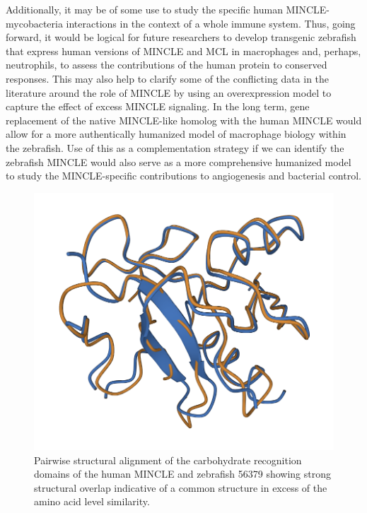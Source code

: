 Additionally, it may be of some use to study the specific human MINCLE\hyp{}mycobacteria interactions in the context of a whole immune system. Thus, going forward, it would be logical for future researchers to develop transgenic zebrafish that express human versions of MINCLE and MCL in macrophages and, perhaps, neutrophils, to assess the contributions of the human protein to conserved responses. This may also help to clarify some of the conflicting data in the literature around the role of MINCLE by using an overexpression model to capture the effect of excess MINCLE signaling. In the long term, gene replacement of the native MINCLE\hyp{}like homolog with the human MINCLE would allow for a more authentically humanized model of macrophage biology within the zebrafish. Use of this as a complementation strategy if we can identify the zebrafish MINCLE would also serve as a more comprehensive humanized model to study the MINCLE\hyp{}specific contributions to angiogenesis and bacterial control.

\begin{figure}
\centering
\includegraphics[width=\textwidth]{images/56379_align.png}
\caption{Pairwise structural alignment of the carbohydrate recognition domains of the human MINCLE and zebrafish 56379 showing strong structural overlap indicative of a common structure in excess of the amino acid level similarity.}
\label{figure:56379}
\end{figure}


